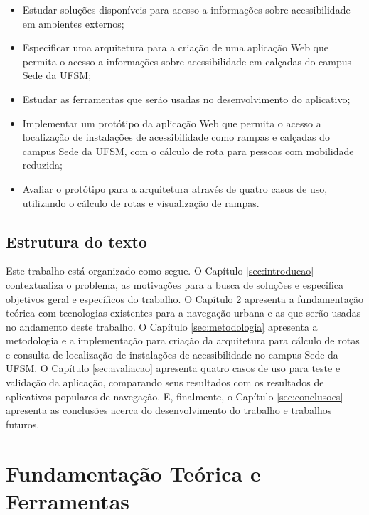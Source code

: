 \documentclass[oneside,openright,12pt]{ufsm_2015} %
\begin{document}
\begin{itemize}
\item Estudar soluções disponíveis para acesso a informações sobre acessibilidade em ambientes externos;
\item Especificar uma arquitetura para a criação de uma aplicação Web que permita o acesso a informações sobre acessibilidade em calçadas do campus Sede da UFSM;
\item Estudar as ferramentas que serão usadas no desenvolvimento do aplicativo;
\item Implementar um protótipo da aplicação Web que permita o acesso a localização de instalações de acessibilidade como rampas e calçadas do campus Sede da UFSM, com o cálculo de rota para pessoas com mobilidade reduzida;
\item Avaliar o protótipo para a arquitetura através de quatro casos de uso, utilizando o cálculo de rotas e visualização de rampas.
\end{itemize}

\section{Estrutura do texto}

Este trabalho está organizado como segue. 
O Capítulo \ref{sec:introducao} contextualiza o problema, as motivações para a busca de soluções e especifica objetivos geral e específicos do trabalho.
O Capítulo \ref{sec:fundamentacao} apresenta a  fundamentação teórica com tecnologias existentes para a navegação urbana e as que serão usadas no andamento deste trabalho.
O Capítulo \ref{sec:metodologia} apresenta a metodologia e a implementação para criação da arquitetura para cálculo de rotas e consulta de localização de instalações de acessibilidade no campus Sede da UFSM.
O Capítulo \ref{sec:avaliacao} apresenta quatro casos de uso para teste e validação da aplicação, comparando seus resultados com os resultados de aplicativos populares de navegação. 
E, finalmente, o Capítulo \ref{sec:conclusoes} apresenta as conclusões acerca do desenvolvimento do trabalho e trabalhos futuros.



\chapter{Fundamentação Teórica e Ferramentas}
\label{sec:fundamentacao}
\end{document}
